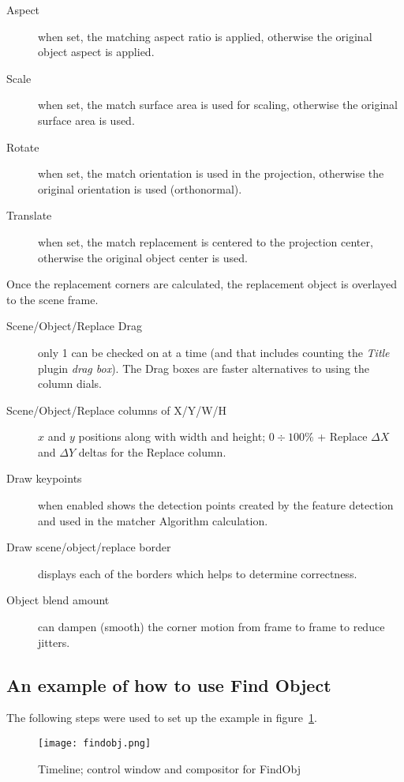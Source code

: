 \begin{description}
    \item[Aspect] when set, the matching aspect ratio is applied, otherwise the original object aspect is applied.
    \item[Scale] when set, the match surface area is used for scaling, otherwise the original surface area is used.
    \item[Rotate] when set, the match orientation is used in the projection, otherwise the original orientation is used (orthonormal).
    \item[Translate] when set, the match replacement is centered to the projection center, otherwise the original object center is used.
\end{description}

Once the replacement corners are calculated, the replacement object is overlayed to the scene frame.

\begin{description}
    \item[Scene/Object/Replace Drag] only 1 can be checked on at a time (and that includes counting the \textit{Title}
    plugin \textit{drag box}). The Drag boxes are faster alternatives to using the column dials.
    \item[Scene/Object/Replace columns of X/Y/W/H] $x$ and $y$ positions along with width and height; $0\div100\%$ + Replace $\Delta X$ and $\Delta Y$ deltas for the Replace column.
    \item[Draw keypoints] when enabled shows the detection points created by the feature detection and used in the matcher Algorithm calculation.
    \item[Draw scene/object/replace border] displays each of the borders which helps to determine correctness.
    \item[Object blend amount] can dampen (smooth) the corner motion from frame to frame to reduce jitters.
\end{description}

\subsection{An example of how to use Find Object}%
\label{sub:example_how_use_findobj}

The following steps were used to set up the example in figure~\ref{fig:findobj}.

\begin{figure}[htpb]
    \centering
    \texttt{[image: findobj.png]}
    \caption{Timeline; control window and compositor for FindObj}
    \label{fig:findobj}
\end{figure}

